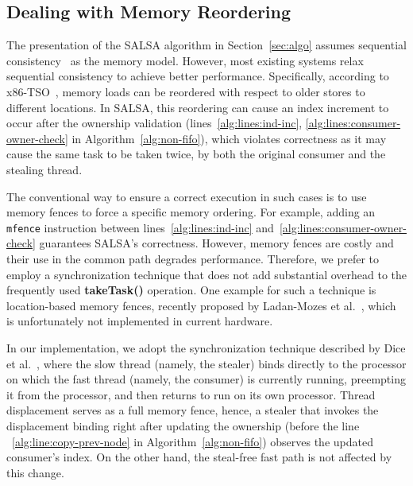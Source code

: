 \subsection {Dealing with Memory Reordering}
\label{sec:memory-order}
The presentation of the SALSA algorithm in Section~\ref{sec:algo} assumes sequential consistency~\cite{Lamport:SC} as the memory model. However, most existing systems relax sequential consistency to achieve better performance. Specifically, according to x86-TSO~\cite{Sewell:x86-tso}, memory loads can be reordered with respect to older stores to different locations. In SALSA, this reordering can cause an index increment to occur after the ownership validation (lines~\ref{alg:lines:ind-inc}, \ref{alg:lines:consumer-owner-check} in Algorithm~\ref{alg:non-fifo}), which violates correctness as it may cause the same task to be taken twice, by both the original consumer and the stealing thread.

The conventional way to ensure a correct execution in such cases is to use memory fences to force a specific memory ordering.
For example, adding an \texttt{mfence} instruction between lines~\ref{alg:lines:ind-inc} and~\ref{alg:lines:consumer-owner-check} guarantees SALSA's correctness. However, memory fences are costly and their use in the common path degrades performance. Therefore, we prefer to employ a synchronization technique that does not add substantial overhead to the frequently used {\bf takeTask()} operation. One example for such a technique is location-based memory fences, recently proposed by Ladan-Mozes et al.~\cite{Ladan-Mozes:lmf}, which is unfortunately not implemented in current hardware.

In our implementation, we adopt the synchronization technique described by Dice et al.~\cite{dice:fences}, where the slow thread (namely, the
stealer) binds directly to the processor on which the fast thread (namely, the consumer) is currently running, preempting it from the processor, and then returns to run on its own processor. Thread displacement serves as a full memory fence, hence, a stealer that invokes the displacement binding right after updating the ownership (before the line ~\ref{alg:line:copy-prev-node} in Algorithm~\ref{alg:non-fifo}) observes the updated consumer's index. On the other hand, the steal-free fast path is not affected by this change.

